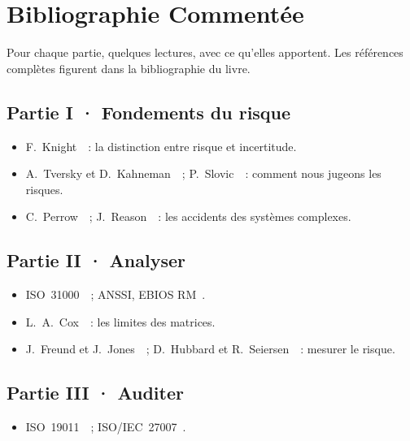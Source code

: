
\chapter{Bibliographie Commentée}
\label{ann:bibliographie}

Pour chaque partie, quelques lectures, avec ce qu'elles apportent. Les références
complètes figurent dans la bibliographie du livre.

\section*{Partie I · Fondements du risque}
\begin{itemize}
    \item F.~Knight~\cite{knight1921}~: la distinction entre risque et incertitude.
    \item A.~Tversky et D.~Kahneman~\cite{tversky1974}~; P.~Slovic~\cite{slovic1987}~: comment nous jugeons les risques.
    \item C.~Perrow~\cite{perrow1984}~; J.~Reason~\cite{reason1997}~: les accidents des systèmes complexes.
\end{itemize}

\section*{Partie II · Analyser}
\begin{itemize}
    \item ISO~31000~\cite{iso31000_2018}~; ANSSI, EBIOS RM~\cite{anssi2018ebios}.
    \item L.~A.~Cox~\cite{cox2008matrices}~: les limites des matrices.
    \item J.~Freund et J.~Jones~\cite{freund2014fair}~; D.~Hubbard et R.~Seiersen~\cite{hubbard2016cyber}~: mesurer le risque.
\end{itemize}

\section*{Partie III · Auditer}
\begin{itemize}
    \item ISO~19011~\cite{iso19011_2018}~; ISO/IEC~27007~\cite{iso27007_2020}.
\end{itemize}

